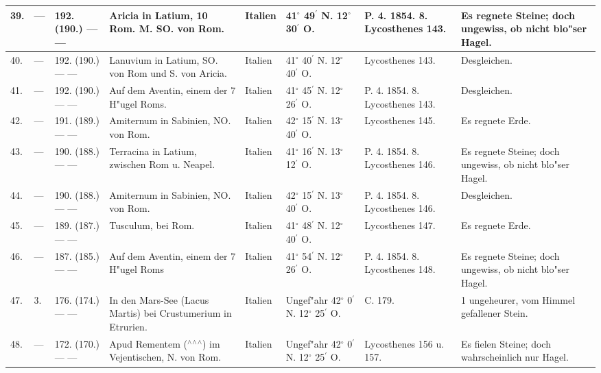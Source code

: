 \documentclass[a4paper, 8pt, oneside, polutonikogreek, german]{article}
\begin{document}
\begin{center}
\begin{longtable}{| p{4mm} | p{2mm} | p{15mm} | p{25mm} | p{16mm} | p{12mm} | p{13mm} | p{20mm} |}
        39. & --- & 192. (190.) --- --- & Aricia in Latium, 10 Rom. M. SO. von Rom. & Italien & 41$^\circ$ 49$^\prime$ N. 12$^\circ$ 30$^\prime$ O. & P. 4. 1854. 8. Lycosthenes 143. & Es regnete Steine; doch ungewiss, ob nicht blo"ser Hagel. \\ \hline
        40. & --- & 192. (190.) --- --- & Lanuvium in Latium, SO. von Rom und S. von Aricia. & Italien & 41$^\circ$ 40$^\prime$ N. 12$^\circ$ 40$^\prime$ O. & Lycosthenes 143. & Desgleichen. \\ \hline
        41. & --- & 192. (190.) --- --- & Auf dem Aventin, einem der 7 H"ugel Roms. & Italien & 41$^\circ$ 45$^\prime$ N. 12$^\circ$ 26$^\prime$ O. & P. 4. 1854. 8. Lycosthenes 143. & Desgleichen. \\ \hline
        42. & --- & 191. (189.) --- --- & Amiternum in Sabinien, NO. von Rom. & Italien & 42$^\circ$ 15$^\prime$ N. 13$^\circ$ 40$^\prime$ O. & Lycosthenes 145. & Es regnete Erde. \\ \hline
        43. & --- & 190. (188.) --- --- & Terracina in Latium, zwischen Rom u. Neapel. & Italien & 41$^\circ$ 16$^\prime$ N. 13$^\circ$ 12$^\prime$ O. & P. 4. 1854. 8. Lycosthenes 146. & Es regnete Steine; doch ungewiss, ob nicht blo"ser Hagel. \\ \hline
        44. & --- & 190. (188.) --- --- & Amiternum in Sabinien, NO. von Rom. & Italien & 42$^\circ$ 15$^\prime$ N. 13$^\circ$ 40$^\prime$ O. & P. 4. 1854. 8. Lycosthenes 146. & Desgleichen. \\ \hline
        45. & --- & 189. (187.) --- --- & Tusculum, bei Rom. & Italien & 41$^\circ$ 48$^\prime$ N. 12$^\circ$ 40$^\prime$ O. & Lycosthenes 147. & Es regnete Erde. \\ \hline
        46. & --- & 187. (185.) --- --- & Auf dem Aventin, einem der 7 H"ugel Roms & Italien & 41$^\circ$ 54$^\prime$ N. 12$^\circ$ 26$^\prime$ O. & P. 4. 1854. 8. Lycosthenes 148. & Es regnete Steine; doch ungewiss, ob nicht blo"ser Hagel. \\ \hline
        47. & 3. & 176. (174.) --- --- & In den Mars-See (Lacus Martis) bei Crustumerium in Etrurien. & Italien & Ungef"ahr 42$^\circ$ 0$^\prime$ N. 12$^\circ$ 25$^\prime$ O. & C. 179. & 1 ungeheurer, vom Himmel gefallener Stein. \\ \hline
        48. & --- & 172. (170.) --- --- & Apud Rementem ($^\wedge$$^\wedge$$^\wedge$) im Vejentischen, N. von Rom. & Italien & Ungef"ahr 42$^\circ$ 0$^\prime$ N. 12$^\circ$ 25$^\prime$ O. & Lycosthenes 156 u. 157. & Es fielen Steine; doch wahrscheinlich nur Hagel. \\ \hline

\end{longtable}
\end{center}
\end{document}
